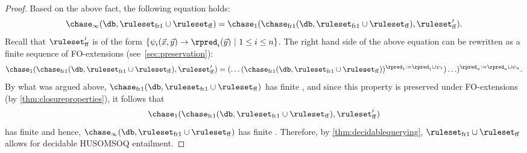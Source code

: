 \begin{proof}
 Based on the above fact, the following equation holds:
$$
\chase_{\infty}(\db,\ruleset_{\smash{\mathrm{fr1}}} \cup \ruleset_{\smash{\mathrm{ff}}}) = \chase_{1}(\chase_{\smash{\mathrm{fr1}}}(\db,\ruleset_{\smash{\mathrm{fr1}}} \cup \ruleset_{\smash{\mathrm{ff}}}), \ruleset_{\smash{\mathrm{ff}}}').
$$%
 Recall that $\ruleset_{\smash{\mathrm{ff}}}'$ is of the form $\{\psi_{i}(\vec{x}, \vec{y}) \rightarrow \rpred_{i}(\vec{y}) \ | \ 1 \leq i \leq n\}$. The right hand side of the above equation can be rewritten as a finite sequence of FO-extensions (see~\cref{sec:preservation}):%
$$
\chase_{1}(\chase_{\smash{\mathrm{fr1}}}(\db,\ruleset_{\smash{\mathrm{fr1}}} \cup \ruleset_{\smash{\mathrm{ff}}}), \ruleset_{\smash{\mathrm{ff}}}') = (\ldots(\chase_{\smash{\mathrm{fr1}}}(\db,\ruleset_{\smash{\mathrm{fr1}}} \cup \ruleset_{\smash{\mathrm{ff}}}))^{\rpred_{1}:= \rpred_{1} \cup \psi_{1}})\ldots)^{\rpred_{n}:= \rpred_{n} \cup \psi_{n}}.
$$%
 By what was argued above, $\chase_{\smash{\mathrm{fr1}}}(\db,\ruleset_{\smash{\mathrm{fr1}}} \cup \ruleset_{\smash{\mathrm{ff}}})$ has finite \hypercliquewidth{}, and since this property is preserved under FO-extensions (by \cref{thm:closureproperties}), it follows that  $$\chase_{1}(\chase_{\smash{\mathrm{fr1}}}(\db,\ruleset_{\smash{\mathrm{fr1}}} \cup \ruleset_{\smash{\mathrm{ff}}}), \ruleset_{\smash{\mathrm{ff}}}')$$has finite \ercwidth{} and hence, $\chase_{\infty}(\db,\ruleset_{\smash{\mathrm{fr1}}} \cup \ruleset_{\smash{\mathrm{ff}}})$ has finite \ercwidth{}. Therefore, by \cref{thm:decidablequerying}, $\ruleset_{\smash{\mathrm{fr1}}} \cup \ruleset_{\smash{\mathrm{ff}}}$ allows for decidable HUSOMSOQ entailment.
\end{proof}

